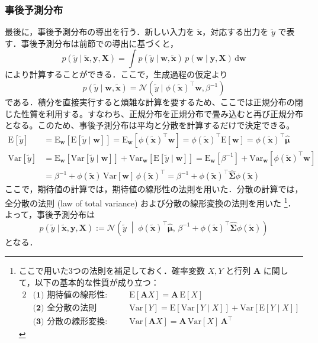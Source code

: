 \documentclass[titlepage]{ltjsbook}
\begin{document}
\subsubsection{事後予測分布}
最後に，事後予測分布の導出を行う．新しい入力を $\tilde{\mathbf{x}}$，対応する出力を $\tilde{y}$ で表す．事後予測分布は前節での導出に基づくと，
\begin{equation}
p(\tilde{y} \mid \tilde{\mathbf{x}},\mathbf{y},\mathbf{X})=\int p(\tilde{y}\mid \mathbf{w},\tilde{\mathbf{x}})\,p(\mathbf{w}\mid \mathbf{y},\mathbf{X})\,\mathrm{d}\mathbf{w}
\end{equation}
により計算することができる．ここで，生成過程の仮定より
\begin{equation}
p(\tilde{y}\mid \mathbf{w},\tilde{\mathbf{x}})=\mathcal{N}\left(\tilde{y}\mid  \phi(\tilde{\mathbf{x}})^\top\mathbf{w}, \beta^{-1}\right)
\end{equation}
である．積分を直接実行すると煩雑な計算を要するため、ここでは正規分布の閉じた性質を利用する。すなわち、正規分布を正規分布で畳み込むと再び正規分布となる。このため、事後予測分布は平均と分散を計算するだけで決定できる。
\begin{align}
\mathrm{E}[\tilde{y}]&=\mathrm{E}_{\mathbf{w}} \left[\mathrm{E}[\tilde{y} \mid \mathbf{w}] \right]=\mathrm{E}_{\mathbf{w}} \left[\phi(\tilde{\mathbf{x}})^\top\mathbf{w} \right]=\phi(\tilde{\mathbf{x}})^\top\mathrm{E}[\mathbf{w}]=\phi(\tilde{\mathbf{x}})^\top\hat{\boldsymbol{\mu}}\\
\mathrm{Var}[\tilde{y}] &= \mathrm{E}_{\mathbf{w}}\left[ \mathrm{Var}[\tilde{y}\mid \mathbf{w}] \right] + \mathrm{Var}_{\mathbf{w}}\left[ \mathrm{E}[\tilde{y} \mid \mathbf{w}] \right]=\mathrm{E}_{\mathbf{w}}\left[\beta^{-1} \right] + \mathrm{Var}_{\mathbf{w}}\left[\phi(\tilde{\mathbf{x}})^\top\mathbf{w} \right]\\
&=\beta^{-1}+\phi(\tilde{\mathbf{x}})\,\mathrm{Var}[\mathbf{w}]\,\phi(\tilde{\mathbf{x}})^\top=\beta^{-1}+\phi(\tilde{\mathbf{x}})^\top\hat{\boldsymbol{\Sigma}} \phi(\tilde{\mathbf{x}})
\end{align}
ここで，期待値の計算では，期待値の線形性の法則を用いた．分散の計算では，全分散の法則 (law of total variance) および分散の線形変換の法則を用いた
\footnote{ここで用いた3つの法則を補足しておく．確率変数 $X, Y$ と行列 $\mathbf{A}$ に関して，以下の基本的な性質が成り立つ：
\begin{alignat*}{2}
&\textbf{(1) 期待値の線形性:} 
&&\quad \mathrm{E}[\mathbf{A}X] = \mathbf{A}\,\mathrm{E}[X] \\
&\textbf{(2) 全分散の法則（分散分解の法則）:} 
&&\quad \mathrm{Var}[Y] = \mathrm{E}\!\left[\mathrm{Var}[Y\mid X]\right] 
   + \mathrm{Var}\!\left[\mathrm{E}[Y\mid X]\right] \\
&\textbf{(3) 分散の線形変換:} 
&&\quad \mathrm{Var}[\mathbf{A}X] = \mathbf{A}\,\mathrm{Var}[X]\,\mathbf{A}^\top
\end{alignat*}
}．
よって，事後予測分布は
\begin{equation}
p(\tilde{y} \mid \tilde{\mathbf{x}},\mathbf{y},\mathbf{X}):=\mathcal{N}\left(\tilde{y}\;\middle\vert\; \phi(\tilde{\mathbf{x}})^\top\hat{\boldsymbol{\mu}},\,\beta^{-1}+\phi(\tilde{\mathbf{x}})^\top\hat{\boldsymbol{\Sigma}} \phi(\tilde{\mathbf{x}})\right)
\end{equation}
となる．
\end{document}
